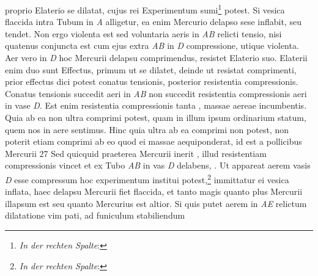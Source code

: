  proprio Elaterio\protect{} se dilatat, cujus rei Experimentum sumi\footnote{\textit{In der rechten Spalte}: }  potest. Si vesica flaccida intra Tubum in \textit{A}  alligetur, ea enim Mercurio\protect{} delapso sese  inflabit,  seu tendet. Non ergo violenta est  sed voluntaria  aeris in \textit{AB} relicti tensio\protect{}, nisi quatenus conjuncta  est cum ejus extra \textit{AB} in \textit{D} compressione, utique violenta.  Aer vero in \textit{D} hoc Mercurii\protect{} delapsu comprimendus, resistet Elaterio\protect{} suo. Elaterii\protect{} enim duo sunt Effectus,  primum ut se dilatet, deinde ut resistat comprimenti,  prior effectus dici potest conatus\protect{} tensionis,  posterior resistentia compressionis. Conatus\protect{} tensionis  succedit aeri in  \textit{AB} non succedit resistentia compressionis aeri in vase \textit{D}. Est enim resistentia  compressionis tanta ,  massae\protect{} aereae incumbentis. Quia ab ea non ultra  comprimi potest, quam in illum ipsum ordinarium  statum, quem nos in aere sentimus. Hinc quia ultra  ab ea comprimi non potest, non poterit etiam  comprimi ab eo quod ei massae\protect{} aequiponderat, id est  a pollicibus Mercurii\protect{} 27  Sed quicquid praeterea Mercurii\protect{} inerit , illud resistentiam  compressionis vincet et ex Tubo \textit{AB} in  vas \textit{D} delabens, . Ut  appareat aerem vasis \textit{D} esse  compressum hoc experimentum institui potest,\footnote{\textit{In der rechten Spalte}: } immittatur  ei vesica inflata, haec delapsu Mercurii\protect{} fiet flaccida,  et tanto magis quanto plus Mercurii\protect{} illapsum est seu quanto Mercurius\protect{} est altior. Si quis putet aerem in \textit{AE}  relictum dilatatione vim pati, ad funiculum\protect{} stabiliendum 